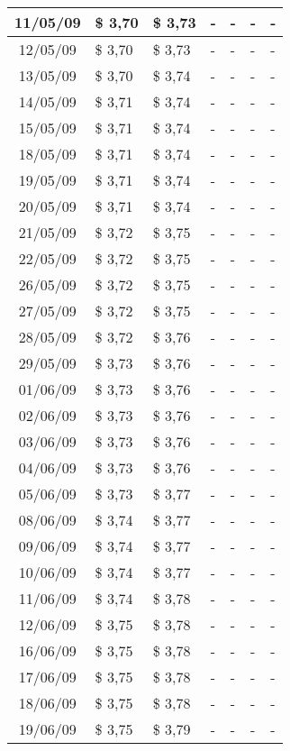 \begin{center}
\begin{longtable}{|c|p{1.5cm}|p{1.5cm}|p{1.5cm}|p{1.5cm}|p{1.5cm}|p{1.5cm}|}
11/05/09 & \$ 3,70 & \$ 3,73 & - & - & - & - \\ \hline
12/05/09 & \$ 3,70 & \$ 3,73 & - & - & - & - \\ \hline
13/05/09 & \$ 3,70 & \$ 3,74 & - & - & - & - \\ \hline
14/05/09 & \$ 3,71 & \$ 3,74 & - & - & - & - \\ \hline
15/05/09 & \$ 3,71 & \$ 3,74 & - & - & - & - \\ \hline
18/05/09 & \$ 3,71 & \$ 3,74 & - & - & - & - \\ \hline
19/05/09 & \$ 3,71 & \$ 3,74 & - & - & - & - \\ \hline
20/05/09 & \$ 3,71 & \$ 3,74 & - & - & - & - \\ \hline
21/05/09 & \$ 3,72 & \$ 3,75 & - & - & - & - \\ \hline
22/05/09 & \$ 3,72 & \$ 3,75 & - & - & - & - \\ \hline
26/05/09 & \$ 3,72 & \$ 3,75 & - & - & - & - \\ \hline
27/05/09 & \$ 3,72 & \$ 3,75 & - & - & - & - \\ \hline
28/05/09 & \$ 3,72 & \$ 3,76 & - & - & - & - \\ \hline
29/05/09 & \$ 3,73 & \$ 3,76 & - & - & - & - \\ \hline
01/06/09 & \$ 3,73 & \$ 3,76 & - & - & - & - \\ \hline
02/06/09 & \$ 3,73 & \$ 3,76 & - & - & - & - \\ \hline
03/06/09 & \$ 3,73 & \$ 3,76 & - & - & - & - \\ \hline
04/06/09 & \$ 3,73 & \$ 3,76 & - & - & - & - \\ \hline
05/06/09 & \$ 3,73 & \$ 3,77 & - & - & - & - \\ \hline
08/06/09 & \$ 3,74 & \$ 3,77 & - & - & - & - \\ \hline
09/06/09 & \$ 3,74 & \$ 3,77 & - & - & - & - \\ \hline
10/06/09 & \$ 3,74 & \$ 3,77 & - & - & - & - \\ \hline
11/06/09 & \$ 3,74 & \$ 3,78 & - & - & - & - \\ \hline
12/06/09 & \$ 3,75 & \$ 3,78 & - & - & - & - \\ \hline
16/06/09 & \$ 3,75 & \$ 3,78 & - & - & - & - \\ \hline
17/06/09 & \$ 3,75 & \$ 3,78 & - & - & - & - \\ \hline
18/06/09 & \$ 3,75 & \$ 3,78 & - & - & - & - \\ \hline
19/06/09 & \$ 3,75 & \$ 3,79 & - & - & - & - \\ \hline

\end{longtable}
\end{center}
